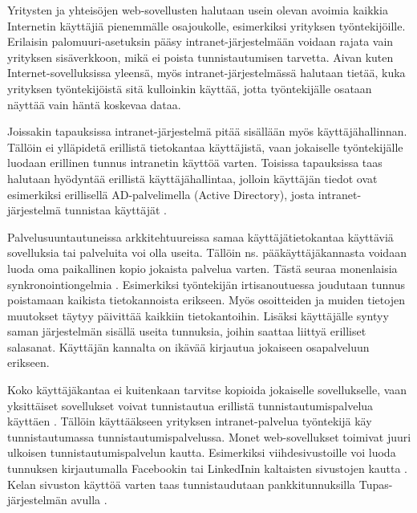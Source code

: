 Yritysten ja yhteisöjen web-sovellusten halutaan usein olevan avoimia kaikkia Internetin käyttäjiä pienemmälle osajoukolle, esimerkiksi yrityksen työntekijöille. Erilaisin palomuuri-asetuksin pääsy intranet-järjestelmään voidaan rajata vain yrityksen sisäverkkoon, mikä ei poista tunnistautumisen tarvetta. Aivan kuten Internet-sovelluksissa yleensä, myös intranet-järjestelmässä halutaan tietää, kuka yrityksen työntekijöistä sitä kulloinkin käyttää, jotta työntekijälle osataan näyttää vain häntä koskevaa dataa.

Joissakin tapauksissa intranet-järjestelmä pitää sisällään myös käyttäjähallinnan. Tällöin ei ylläpidetä erillistä tietokantaa käyttäjistä, vaan jokaiselle työntekijälle luodaan erillinen tunnus intranetin käyttöä varten. Toisissa tapauksissa taas halutaan hyödyntää erillistä käyttäjähallintaa, jolloin käyttäjän tiedot ovat esimerkiksi erillisellä AD-palvelimella (Active Directory), josta intranet-järjestelmä tunnistaa käyttäjät \cite{active_directory}.

Palvelusuuntautuneissa arkkitehtuureissa samaa käyttäjätietokantaa käyttäviä sovelluksia tai palveluita voi olla useita. Tällöin ns. pääkäyttäjäkannasta voidaan luoda oma paikallinen kopio jokaista palvelua varten. Tästä seuraa monenlaisia synkronointiongelmia \cite{synkronointi}. Esimerkiksi työntekijän irtisanoutuessa joudutaan tunnus poistamaan kaikista tietokannoista erikseen. Myös osoitteiden ja muiden tietojen muutokset täytyy päivittää kaikkiin tietokantoihin. Lisäksi käyttäjälle syntyy saman järjestelmän sisällä useita tunnuksia, joihin saattaa liittyä erilliset salasanat. Käyttäjän kannalta on ikävää kirjautua jokaiseen osapalveluun erikseen.

Koko käyttäjäkantaa ei kuitenkaan tarvitse kopioida jokaiselle sovellukselle, vaan yksittäiset sovellukset voivat tunnistautua erillistä tunnistautumispalvelua käyttäen \cite{facebook}. Tällöin käyttääkseen yrityksen intranet-palvelua työntekijä käy tunnistautumassa tunnistautumispalvelussa. Monet web-sovellukset toimivat juuri ulkoisen tunnistautumispalvelun kautta. Esimerkiksi viihdesivustoille voi luoda tunnuksen kirjautumalla Facebookin tai LinkedInin kaltaisten sivustojen kautta \cite{facebook}. Kelan sivuston käyttöä varten taas tunnistaudutaan pankkitunnuksilla Tupas-järjestelmän avulla \cite{tupas}.